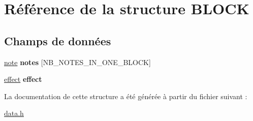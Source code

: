 \hypertarget{struct_b_l_o_c_k}{
\section{Référence de la structure BLOCK}
\label{struct_b_l_o_c_k}
}
\subsection*{Champs de données}
\begin{DoxyCompactItemize}
\item 
\hypertarget{struct_b_l_o_c_k_a67c3894ec855ff15d73374ec4a2394e6}{
\hyperlink{struct_n_o_t_e}{note} {\bfseries notes} \mbox{[}NB\_\-NOTES\_\-IN\_\-ONE\_\-BLOCK\mbox{]}}
\label{struct_b_l_o_c_k_a67c3894ec855ff15d73374ec4a2394e6}

\item 
\hypertarget{struct_b_l_o_c_k_a741151ee9cb5c0bde79f6dfee55f951a}{
\hyperlink{struct_e_f_f_e_c_t}{effect} {\bfseries effect}}
\label{struct_b_l_o_c_k_a741151ee9cb5c0bde79f6dfee55f951a}

\end{DoxyCompactItemize}


La documentation de cette structure a été générée à partir du fichier suivant :\begin{DoxyCompactItemize}
\item 
\hyperlink{data_8h}{data.h}\end{DoxyCompactItemize}
